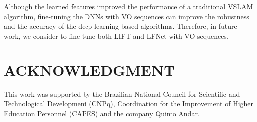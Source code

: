 \documentclass[a4paper, 10pt, conference]{ieeeconf}      %
\begin{document}
Although the learned features improved the performance of a traditional VSLAM algorithm, fine-tuning the DNNs with VO sequences can improve the robustness and the accuracy of the deep learning-based algorithms. Therefore, in future work, we consider to fine-tune both LIFT and LFNet with VO sequences.












\section*{ACKNOWLEDGMENT}
This work was supported by the Brazilian National Council for Scientific and Technological Development (CNPq), Coordination for the Improvement of Higher Education Personnel (CAPES) and the company Quinto Andar.




\end{document}
